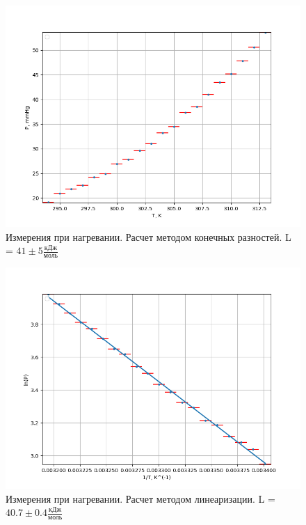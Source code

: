 \documentclass[12pt]{article}
\begin{document}
\begin{figure}[H]
	\centering
	\includegraphics[scale = 0.8]{./images/He.png}
	\caption{Измерения при нагревании. Расчет методом конечных разностей. L = $41 \pm 5\frac{\text{кДж}}{\text{моль}}$ }
\end{figure}

\begin{figure}[H]
	\centering
	\includegraphics[scale = 0.8]{./images/HeLin.png}
	\caption{Измерения при нагревании. Расчет методом линеаризации. L = $40.7 \pm 0.4\frac{\text{кДж}}{\text{моль}}$ }
\end{figure}
\end{document}
